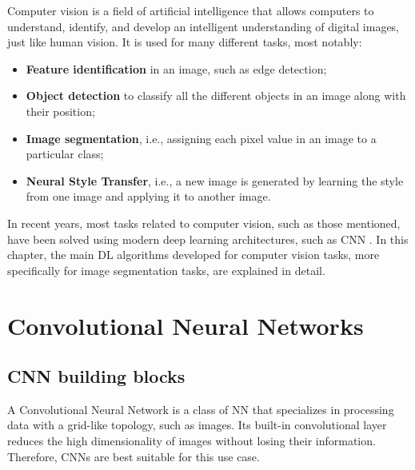 \cleardoublepage
\label{chapter:background}
Computer vision is a field of artificial intelligence that allows computers to understand, identify, and develop an intelligent understanding of digital images, just like human vision. It is used for many different tasks, most notably:

\begin{itemize}
    \item \textbf{Feature identification} in an image, such as edge detection;
    \item \textbf{Object detection} to classify all the different objects in an image along with their position;
    \item \textbf{Image segmentation}, i.e., assigning each pixel value in an image to a particular class;
    \item \textbf{Neural Style Transfer}, i.e., a new image is generated by learning the style from one image and applying it to another image.
\end{itemize}

In recent years, most tasks related to computer vision, such as those mentioned, have been solved using modern deep learning architectures, such as \ac{CNN} \cite{review:CV}. In this chapter, the main \ac{DL} algorithms developed for computer vision tasks, more specifically for image segmentation tasks, are explained in detail. 

\section{Convolutional Neural Networks}
\label{section:CNN&UNET}


\subsection{CNN building blocks}

A Convolutional Neural Network is a class of \ac{NN} that specializes in processing data with a grid-like topology, such as images. Its built-in convolutional layer reduces the high dimensionality of images without losing their information. Therefore, \ac{CNNs} are best suitable for this use case.


